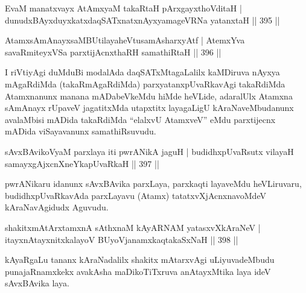 
\begin{shl}
EvaM manatxvayx AtAmx\s yaM takaRtaH pArxgayxthoVditaH |
dunudxBAyxduyxkatxdaqSATxnatxnAyxyamageVRNa yatanxtaH \hfill || 395 ||
\end{shl}
\begin{shl}
AtamxsAmAnayxsaMBUtilayaheVtusamAsharxyAtf |
AtemxYva savaRmiteyxVSa parxtijAcnxthaRH samathiRtaH \hfill || 396 ||
\end{shl}

\begin{artha}
I riVtiyAgi duMduBi modalAda daqSATxMtagaLalilx kaMDiruva nAyxya mAgaRdiMda (takaRmAgaRdiMda) parxyatanxpUvaRkavAgi takaRdiMda Atamxnanunx manana mADabeVkeMdu hiMde heVLide, adaralUlx Atamxna sAmAnayx rUpaveV jagatitxMda utapxtitx layagaLigU kAraNaveMbudanunx avalaMbisi mADida takaRdiMda ``elalxvU AtamxveV'' eMdu parxtijecnx mADida viSayavanunx samathiRsuvudu.
\end{artha}

\begin{shl}
sAvxBAvikoV\s yaM parxlaya iti \footnotemark[1]pwrANikA jaguH |
budidhxpUvaRsutx vilayaH samayxgAjxcnXneYkapUvaRkaH \hfill || 397 ||
\end{shl}


\begin{artha}
pwrANikaru idanunx sAvxBAvika parxLaya, parxkaqti layaveMdu heVLiruvaru, budidhxpUvaRkavAda parxLayavu (Atamx) tatatxvXjAcnxnavoMdeV kAraNavAgidudx Aguvudu.
\end{artha}


\begin{shl}
shakitxmAtArxtamxnA sAthxnaM kAyARNAM yatasxvXkAraNeV |
itayxnAtayxnitxkalayoV BUyoVjanamxkaqtakaSxNaH \hfill || 398 ||
\end{shl}

\begin{artha}
kAyaRgaLu tananx kAraNadalilx shakitx mAtarxvAgi uLiyuvadeMbudu \-punajaRnamxkekx avakAsha maDikoTiTxruva anAtayxMtika laya ideV sAvxBAvika laya.
\end{artha}

